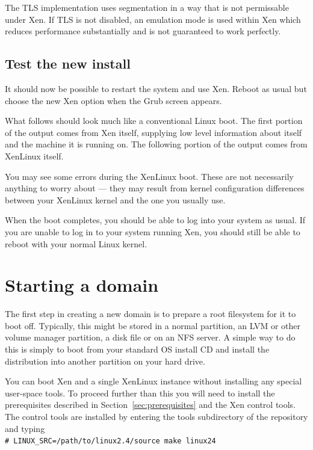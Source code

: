 \documentclass[11pt,twoside,final,openright]{xenstyle}
\begin{document}
The TLS implementation uses segmentation in a way that is not
permissable under Xen.  If TLS is not disabled, an emulation mode is
used within Xen which reduces performance substantially and is not
guaranteed to work perfectly.

\section{Test the new install}

It should now be possible to restart the system and use Xen.  Reboot
as usual but choose the new Xen option when the Grub screen appears.

What follows should look much like a conventional Linux boot.  The
first portion of the output comes from Xen itself, supplying low level
information about itself and the machine it is running on.  The
following portion of the output comes from XenLinux itself.

You may see some errors during the XenLinux boot.  These are not
necessarily anything to worry about --- they may result from kernel
configuration differences between your XenLinux kernel and the one you
usually use.

When the boot completes, you should be able to log into your system as
usual.  If you are unable to log in to your system running Xen, you
should still be able to reboot with your normal Linux kernel.


\chapter{Starting a domain}

The first step in creating a new domain is to prepare a root
filesystem for it to boot off.  Typically, this might be stored in a
normal partition, an LVM or other volume manager partition, a disk
file or on an NFS server.
A simple way to do this is simply to boot from your standard OS
install CD and install the distribution into another partition on your
hard drive.

You can boot Xen and a single XenLinux instance without installing any
special user-space tools. To proceed further than this you will need
to install the prerequisites described in Section~\ref{sec:prerequisites}
and the Xen control tools. The control tools are installed by entering
the tools subdirectory of the repository and typing \\
\verb!# LINUX_SRC=/path/to/linux2.4/source make linux24! \\
\end{document}
